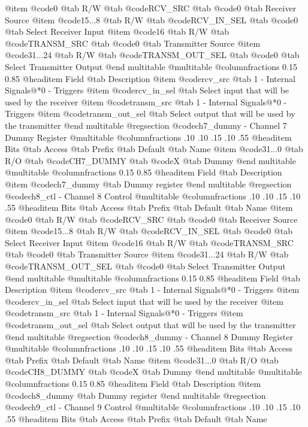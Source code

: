 @item @code{0}
@tab R/W @tab
@code{RCV_SRC}
@tab @code{0} @tab 
Receiver Source
@item @code{15...8}
@tab R/W @tab
@code{RCV_IN_SEL}
@tab @code{0} @tab 
Select Receiver Input
@item @code{16}
@tab R/W @tab
@code{TRANSM_SRC}
@tab @code{0} @tab 
Transmitter Source
@item @code{31...24}
@tab R/W @tab
@code{TRANSM_OUT_SEL}
@tab @code{0} @tab 
Select Transmitter Output
@end multitable
@multitable @columnfractions 0.15 0.85
@headitem Field @tab Description
@item @code{rcv_src} @tab 1 - Internal Signals@*0 - Triggers
@item @code{rcv_in_sel} @tab Select input that will be used by the receiver
@item @code{transm_src} @tab 1 - Internal Signals@*0 - Triggers
@item @code{transm_out_sel} @tab Select output that will be used by the transmitter
@end multitable
@regsection @code{ch7_dummy} - Channel 7 Dummy Register
@multitable @columnfractions .10 .10 .15 .10 .55
@headitem Bits @tab Access @tab Prefix @tab Default @tab Name
@item @code{31...0}
@tab R/O @tab
@code{CH7_DUMMY}
@tab @code{X} @tab 
Dummy
@end multitable
@multitable @columnfractions 0.15 0.85
@headitem Field @tab Description
@item @code{ch7_dummy} @tab Dummy register
@end multitable
@regsection @code{ch8_ctl} - Channel 8 Control
@multitable @columnfractions .10 .10 .15 .10 .55
@headitem Bits @tab Access @tab Prefix @tab Default @tab Name
@item @code{0}
@tab R/W @tab
@code{RCV_SRC}
@tab @code{0} @tab 
Receiver Source
@item @code{15...8}
@tab R/W @tab
@code{RCV_IN_SEL}
@tab @code{0} @tab 
Select Receiver Input
@item @code{16}
@tab R/W @tab
@code{TRANSM_SRC}
@tab @code{0} @tab 
Transmitter Source
@item @code{31...24}
@tab R/W @tab
@code{TRANSM_OUT_SEL}
@tab @code{0} @tab 
Select Transmitter Output
@end multitable
@multitable @columnfractions 0.15 0.85
@headitem Field @tab Description
@item @code{rcv_src} @tab 1 - Internal Signals@*0 - Triggers
@item @code{rcv_in_sel} @tab Select input that will be used by the receiver
@item @code{transm_src} @tab 1 - Internal Signals@*0 - Triggers
@item @code{transm_out_sel} @tab Select output that will be used by the transmitter
@end multitable
@regsection @code{ch8_dummy} - Channel 8 Dummy Register
@multitable @columnfractions .10 .10 .15 .10 .55
@headitem Bits @tab Access @tab Prefix @tab Default @tab Name
@item @code{31...0}
@tab R/O @tab
@code{CH8_DUMMY}
@tab @code{X} @tab 
Dummy
@end multitable
@multitable @columnfractions 0.15 0.85
@headitem Field @tab Description
@item @code{ch8_dummy} @tab Dummy register
@end multitable
@regsection @code{ch9_ctl} - Channel 9 Control
@multitable @columnfractions .10 .10 .15 .10 .55
@headitem Bits @tab Access @tab Prefix @tab Default @tab Name

